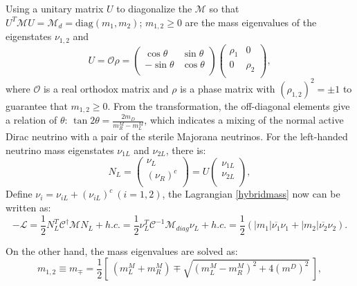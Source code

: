 Using a unitary matrix $U$ to diagonalize the $\mathcal M$ so that ${U}^T\mathcal{M} U =\mathcal {M}_d = \mathrm{diag}(m_1, m_2)$; $m_{1,2}\geq 0$ are the mass eigenvalues of the eigenstates $\nu_{1,2}$ and 
\begin{equation}\label{eq:massTransform}
U=\mathcal{O}\rho=\begin{pmatrix}
\cos\theta & \sin\theta\\
-\sin\theta & \cos\theta\\
\end{pmatrix}\begin{pmatrix}
\rho_1 & 0\\
0 & \rho_2\\
\end{pmatrix},
\end{equation}
where $\mathcal O$ is a real orthodox matrix and $\rho$ is a phase matrix with $(\rho_{1,2})^2=\pm1$ to guarantee that $m_{1,2}\geq 0$.
From the transformation, the off-diagonal elements give a relation of $\theta$: $\tan 2\theta = \frac{2m_D}{m^M_R-m^M_L}$, which indicates a mixing of the normal active Dirac neutrino with a pair of the sterile Majorana neutrinos. For the left-handed neutrino mass eigenstates $\nu_{1L}$ and $\nu_{2L}$, there is\cite{akhmedov2014majorana}:
\begin{equation}\label{eq:NLtransform}
N_L=\begin{pmatrix}
\nu_{L}\\
(\nu_{R})^c\\
\end{pmatrix}=U
\begin{pmatrix}
\nu_{1L}\\
\nu_{2L}\\
\end{pmatrix},
\end{equation}
Define
$\nu_{i}=\nu_{iL}+(\nu_{iL})^c~(i = 1,2)$, the Lagrangian \ref{hybridmass} now can be written as\cite{akhmedov2014majorana,giunti2007fundamentals}:
\begin{equation}
-\mathcal L=\frac{1}{2}N_L^T\mathcal{C}^{\dagger}\mathcal M N_L+h.c.=\frac{1}{2}\nu_L^T\mathcal{C}^{-1}\mathcal M_{diag} \nu_L+h.c.=\frac{1}{2}(|m_1|\overline{\nu_1}\nu_1+|m_2|\overline{\nu_2}\nu_2).
\end{equation}

On the other hand, the mass eigenvalues are solved as:
\begin{equation}
m_{1,2}\equiv m_{\mp} = \frac{1}{2}[~(m_L^M+m_R^M)\mp\sqrt{(m_L^M-m_R^M)^2+4(m^D)^2}~]\label{eq:majorana_massEigen},
\end{equation}

